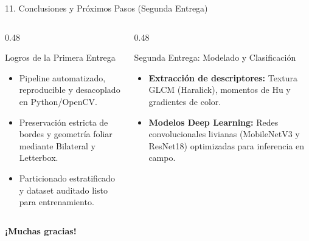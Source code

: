 \documentclass[aspectratio=169,10pt]{beamer}
\begin{document}
\begin{frame}{11. Conclusiones y Próximos Pasos (Segunda Entrega)}
    \begin{columns}[T]
        \begin{column}{0.48\textwidth}
            \begin{block}{Logros de la Primera Entrega}
                \begin{itemize}
                    \item Pipeline automatizado, reproducible y desacoplado en Python/OpenCV.
                    \item Preservación estricta de bordes y geometría foliar mediante Bilateral y Letterbox.
                    \item Particionado estratificado y dataset auditado listo para entrenamiento.
                \end{itemize}
            \end{block}
        \end{column}
        
        \begin{column}{0.48\textwidth}
            \begin{exampleblock}{Segunda Entrega: Modelado y Clasificación}
                \begin{itemize}
                    \item \textbf{Extracción de descriptores:} Textura GLCM (Haralick), momentos de Hu y gradientes de color.
                    \item \textbf{Modelos Deep Learning:} Redes convolucionales livianas (MobileNetV3 y ResNet18) optimizadas para inferencia en campo.
                \end{itemize}
            \end{exampleblock}
        \end{column}
    \end{columns}
    \vspace{0.4cm}
    \centering
    \textbf{\Large ¡Muchas gracias!}
\end{frame}
\end{document}
